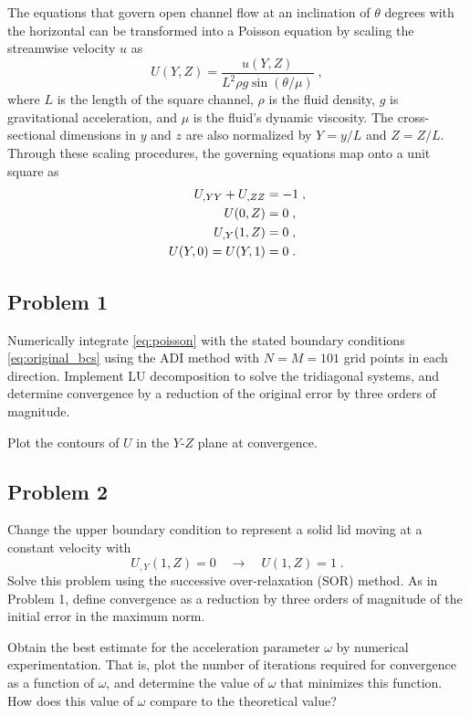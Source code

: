 \documentclass[11pt]{article}
\begin{document}
The equations that govern open channel flow at an inclination of $\theta$ degrees with the horizontal can be transformed into a Poisson equation by scaling the streamwise velocity $u$ as
\begin{equation}
U(Y,Z) = \frac{u(Y,Z)}{L^2 \rho g \sin(\theta / \mu)}
\;,
\end{equation}
where $L$ is the length of the square channel, $\rho$ is the fluid density, $g$ is gravitational acceleration, and $\mu$ is the fluid's dynamic viscosity. The cross-sectional dimensions in $y$ and $z$ are also normalized by $Y = y/L$ and $Z = Z/L$. Through these scaling procedures, the governing equations map onto a unit square as
\begin{align}
U_{,YY} + U_{,ZZ} &= -1
\;, \label{eq:poisson} \\
U(0,Z) &= 0
\;, \notag\\
U_{,Y}(1,Z) &= 0
\;, \notag\\
U(Y,0) = U(Y,1) &= 0
\;.
\label{eq:original_bcs}
\end{align}

\subsection{Problem 1}

Numerically integrate \eqref{eq:poisson} with the stated boundary conditions \eqref{eq:original_bcs} using the ADI method with $N = M = 101$ grid points in each direction. Implement LU decomposition to solve the tridiagonal systems, and determine convergence by a reduction of the original error by three orders of magnitude.

Plot the contours of $U$ in the $Y$-$Z$ plane at convergence.

\subsection{Problem 2}

Change the upper boundary condition to represent a solid lid moving at a constant velocity with
\begin{equation}
U_{,Y}(1,Z) = 0 \quad\longrightarrow\quad U(1,Z) = 1
\;.
\label{eq:new_bcs}
\end{equation}
Solve this problem using the successive over-relaxation (SOR) method. As in Problem 1, define convergence as a reduction by three orders of magnitude of the initial error in the maximum norm.

Obtain the best estimate for the acceleration parameter $\omega$ by numerical experimentation. That is, plot the number of iterations required for convergence as a function of $\omega$, and determine the value of $\omega$ that minimizes this function. How does this value of $\omega$ compare to the theoretical value?
\end{document}
